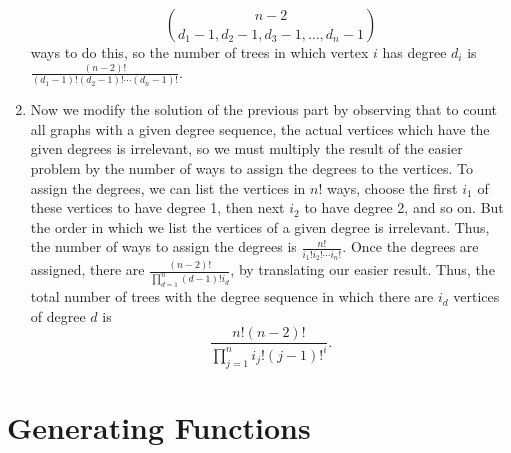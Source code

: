 \documentclass[10pt,]{book}
\theoremstyle{plain}
\theoremstyle{definition}
\theoremstyle{definition}
\numberwithin{equation}{chapter}
\begin{document}
\begin{exerciselist}
\begin{enumerate}[label=(\alph*)]
\begin{equation*}
\binom{n-2}{d_1-1,d_2-1,d_3-1,\dots,d_n-1}
\end{equation*}
ways to do this, so the number of trees in which vertex \(i\) has degree \(d_i\) is \(\frac{(n-2)!}{(d_1-1)!(d_2-1)!\cdots(d_n-1)!}\).%
\item\hypertarget{li-73}{}Now we modify the solution of the previous part by observing that to count all graphs with a given degree sequence, the actual vertices which have the given degrees is irrelevant, so we must multiply the result of the easier problem by the number of ways to assign the degrees to the vertices. To assign the degrees, we can list the vertices in \(n!\) ways, choose the first \(i_1\) of these vertices to have degree 1, then next \(i_2\) to have degree 2, and so on. But the order in which we list the vertices of a given degree is irrelevant. Thus, the number of ways to assign the degrees is \(\frac{n!}{i_1!i_2!\cdots i_n!}\). Once the degrees are assigned, there are \(\frac{(n-2)!}{\prod_{d=1}^n (d-1)! i_d}\), by translating our easier result. Thus, the total number of trees with the degree sequence in which there are \(i_d\) vertices of degree \(d\) is%
\begin{equation*}
\frac{n!(n-2)!}{\prod_{j=1}^n i_j!(j-1)!^i}\text{.}
\end{equation*}
%
\end{enumerate}
%
\end{exerciselist}
\typeout{************************************************}
\typeout{************************************************}
\chapter[{Generating Functions}]{Generating Functions}\label{ch_genfns}
\typeout{************************************************}
\typeout{************************************************}
\end{document}
